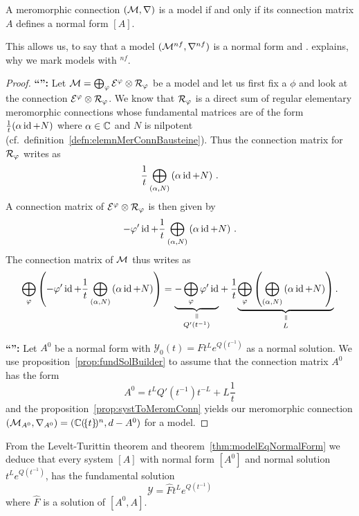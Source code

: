 \begin{thm}\label{thm:modelEqNormalForm}
  A meromorphic connection $(\mathcal{M},\nabla)$ is a model if and only if its
  connection matrix $A$ defines a normal form $[A]$.
  \begin{s-rem}
    This allows us, to say that a model $(\mathcal{M}^{nf},\nabla^{nf})$ is a normal
    form and .
     explains, why we mark models with ${}^{nf}$.
  \end{s-rem}
\end{thm}
\begin{proof}
  \textbf{``\Rightarrow{}'':}
  Let $\mathcal{M}=\bigoplus_{\varphi}\mathcal{E}^\varphi\otimes\mathcal{R}_\varphi$ be a model and let us first
  fix a $\phi$ and look at the connection $\mathcal{E}^\varphi\otimes\mathcal{R}_\varphi$.
  We know that $\mathcal{R}_\varphi$ is a direct sum of regular elementary meromorphic
  connections whose fundamental matrices are of the form
  $\frac{1}{t}(\alpha\operatorname{id}+N)$ where $\alpha\in\mathbb{C}$ and $N$ is nilpotent
  (cf.\ definition~\ref{defn:elemnMerConnBausteine}).
  Thus the connection matrix for $\mathcal{R}_\varphi$ writes as
  \[
    \frac{1}{t} \bigoplus_{(\alpha,N)}\left( \alpha\operatorname{id}+N\right)
    \,.
  \]
  A connection matrix of $\mathcal{E}^\varphi\otimes\mathcal{R}_\varphi$ is then given by
  \[
    -\varphi'\operatorname{id} + \frac{1}{t} \bigoplus_{(\alpha,N)}\left( \alpha\operatorname{id}+N\right) \,.
  \]
  The connection matrix of $\mathcal{M}$ thus writes as
  \[
    \bigoplus_\phi\left(
      -\phi'\id + \frac{1}{t} \bigoplus_{(\alpha,N)}\left( \alpha\id+N\right)
    \right)
    =
    \underset{Q'(t^{-1})}{
      \underset{\text{\rotatebox[origin=c]{-90}{$=$}}}{%
        \underbrace{-\bigoplus_\phi \phi'\id}
      }
    }
    +
    \frac{1}{t}
    \underset{L}{
      \underset{\text{\rotatebox[origin=c]{-90}{$=$}}}{%
        \underbrace{%
          \bigoplus_\phi\left(
            \bigoplus_{(\alpha,N)}\left( \alpha\id+N\right)
          \right)
        }
      }
    }
    \,.
  \]

  \TODO{}

  \textbf{``\Leftarrow{}'':}
  Let $A^0$ be a normal form with $\mathcal{Y}_0(t)=F t^L e^{Q(t^{-1})}$ as a
  normal solution. We use proposition~\ref{prop:fundSolBuilder} to assume that
  the connection matrix $A^0$ has the form
  \[
    A^0=t^LQ'(t^{-1})t^{-L}+L\frac{1}{t}
  \]
  and the proposition~\ref{prop:systToMeromConn} yields our meromorphic
  connection $(\mathcal{M}_{A^0},\nabla_{A^0})=(\mathbb{C}(\!\{t\}\!)^n,d-A^0)$ for
   a model.
  \TODO[Jordan-NF]
\end{proof}
\begin{cor}
  From the Levelt-Turittin theorem and theorem~\ref{thm:modelEqNormalForm} we
  deduce that every system $[A]$ with normal form $[A^0]$ and normal solution
  $t^L e^{Q(t^{-1})}$, has the fundamental solution
  \[
    \mathcal{Y}=\hat F t^L e^{Q(t^{-1})}
  \]
  where $\hat F$ is a solution of $[A^0,A]$.
\end{cor}

